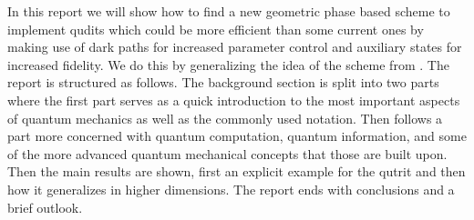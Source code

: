 In this report we will show how to find a new geometric phase based scheme to implement qudits which could be more efficient than some current ones by making use of dark paths for increased parameter control and auxiliary states for increased fidelity. We do this by generalizing the idea of the scheme from \cite{darkpath}. The report is structured as follows. The background section is split into two parts where the first part serves as a quick introduction to the most important aspects of quantum mechanics as well as the commonly used notation. Then follows a part more concerned with quantum computation, quantum information, and some of the more advanced quantum mechanical concepts that those are built upon. Then the main results are shown, first an explicit example for the qutrit and then how it generalizes in higher dimensions. The report ends with conclusions and a brief outlook.


